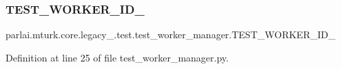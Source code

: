 \subsubsection{\texorpdfstring{T\+E\+S\+T\+\_\+\+W\+O\+R\+K\+E\+R\+\_\+\+I\+D\+\_}{TEST\_WORKER\_ID\_3}}
{\footnotesize\ttfamily parlai.\+mturk.\+core.\+legacy\+\_.\+test.\+test\+\_\+worker\+\_\+manager.\+T\+E\+S\+T\+\_\+\+W\+O\+R\+K\+E\+R\+\_\+\+I\+D\+\_}



Definition at line 25 of file test\+\_\+worker\+\_\+manager.\+py.


